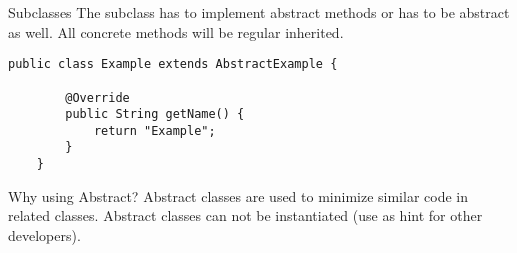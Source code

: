 \begin{frame}[fragile]{Subclasses}
    The subclass has to implement abstract methods or has to be abstract as well.
    All concrete methods will be regular inherited.
    \begin{lstlisting}[escapechar=!]
    public class Example extends AbstractExample {
        
        @Override
        public String getName() {
            return "Example";        
        }
    }    
    \end{lstlisting}
\end{frame}

\begin{frame}{Why using Abstract?}
    Abstract classes are used to minimize similar code in related classes.
    Abstract classes can not be instantiated (use as hint for other developers).
\end{frame}

%

